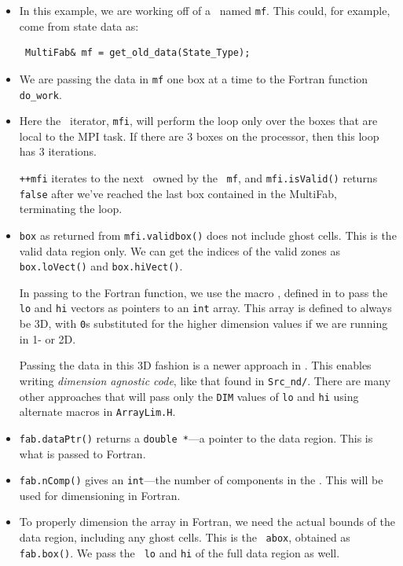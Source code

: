 \begin{itemize}
\item In this example, we are working off of a \multifab\ named {\tt mf}.
  This could, for example, come from state data as:
\begin{lstlisting}
 MultiFab& mf = get_old_data(State_Type);
\end{lstlisting}

\item We are passing the data in {\tt mf} one box at a time to the
  Fortran function {\tt do\_work}.

\item Here the \mfiter\ iterator, {\tt mfi}, will perform the loop
  only over the boxes that are local to the MPI task.  If there are 3
  boxes on the processor, then this loop has 3 iterations.

  {\tt ++mfi} iterates to the next \farraybox\ owned by the
  \multifab\ {\tt mf}, and {\tt mfi.isValid()} returns {\tt false}
  after we've reached the last box contained in the MultiFab,
  terminating the loop.

\item {\tt box} as returned from {\tt mfi.validbox()} does not include
   ghost cells.  This is the valid data region only.
   We can get the indices of the valid zones as {\tt box.loVect()} and
   {\tt box.hiVect()}.

   In passing to the Fortran function, we use the macro
   , defined in  to pass the {\tt lo}
   and {\tt hi} vectors as pointers to an {\tt int} array.  This array
   is defined to always be 3D, with {\tt 0}s substituted for the
   higher dimension values if we are running in 1- or 2D.

   Passing the data in this 3D fashion is a newer approach in \castro.
   This enables writing {\em dimension agnostic code}, like that found
   in {\tt Src\_nd/}.  There are many other approaches that will pass
   only the {\tt DIM} values of {\tt lo} and {\tt hi} using alternate
   macros in {\tt ArrayLim.H}.

\item {\tt fab.dataPtr()} returns a {\tt double *}---a pointer to the
  data region.  This is what is passed to Fortran.

\item {\tt fab.nComp()} gives an {\tt int}---the number of components
  in the \multifab.  This will be used for dimensioning in Fortran.

\item To properly dimension the array in Fortran, we need the actual
  bounds of the data region, including any ghost cells.  This is the
  \bbox\ {\tt abox}, obtained as {\tt fab.box()}.  We pass the {\tt
    lo} and {\tt hi} of the full data region as well.

\end{itemize}

